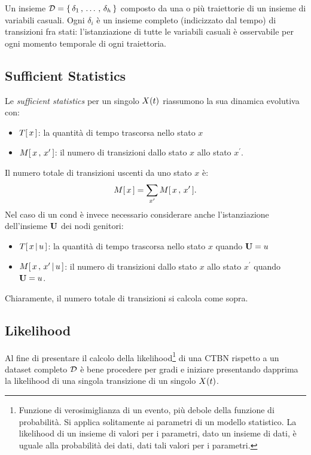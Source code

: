 \begin{definizione}
\label{defn:dataset-completo}
Un insieme $\mathcal{D}=\{\,\delta_1\,,\,\dotsc\,,\,\delta_h\,\}$ composto da una o più traiettorie di un insieme di variabili casuali. Ogni $\delta_i$ è un insieme completo (indicizzato dal tempo) di transizioni fra stati: l'istanziazione di tutte le variabili casuali è osservabile per ogni momento temporale di ogni traiettoria.
\end{definizione}

\subsection{Sufficient Statistics}
\label{sec:ctbn-sufficient-stats}
Le \emph{sufficient statistics} per un singolo \mprocess{} \omog{} $\mathnormal{X}(t)$ riassumono la sua dinamica evolutiva con:
\begin{itemize}
    \item $T[\,x\,]$: la quantità di tempo trascorsa nello stato $x$
    \item $\mstat[x]{x^\prime}$: il numero di transizioni dallo stato $x$ allo stato $x^\prime$.
\end{itemize}

Il numero totale di transizioni uscenti da uno stato $x$ è:
\[
\mstat{x}=\sum_{x^\prime}\mstat[x]{x^\prime}\text{.}
\]
Nel caso di un \mprocess{}cond{} è invece necessario considerare anche l'istanziazione dell'insieme $\mathbf{U}$ dei nodi genitori:
\begin{itemize}
    \item $T[\,x\,\arrowvert\,u\,]$: la quantità di tempo trascorsa nello stato $x$ quando $\mathbf{U}=u$
    \item $\mstat[x]{x^\prime\,\arrowvert\,u}$: il numero di transizioni dallo stato $x$ allo stato $x^\prime$ quando $\mathbf{U}=u$.
\end{itemize}
Chiaramente, il numero totale di transizioni si calcola come sopra.

\subsection{Likelihood}
\label{sec:ctbn-likelihood}
Al fine di presentare il calcolo della likelihood\footnote{Funzione di verosimiglianza di un evento, più debole della funzione di probabilità. Si applica solitamente ai parametri di un modello statistico. La likelihood di un insieme di valori per i parametri, dato un insieme di dati, è uguale alla probabilità dei dati, dati tali valori per i parametri.} di una \acs{CTBN} rispetto a un dataset completo $\mathcal{D}$ è bene procedere per gradi e iniziare presentando dapprima la likelihood di una singola transizione di un singolo \mprocess{} \omog{} $\mathnormal{X}(t)$.

